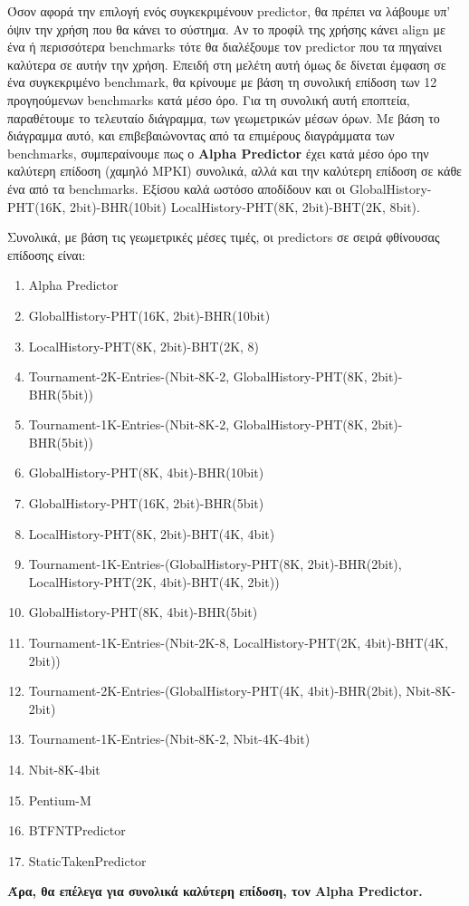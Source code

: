    Όσον αφορά την επιλογή ενός συγκεκριμένουν predictor, θα πρέπει να λάβουμε
   υπ' όψιν την χρήση που θα κάνει το σύστημα. Αν το προφίλ της χρήσης κάνει
   align με ένα ή περισσότερα benchmarks τότε θα διαλέξουμε τον predictor που τα
   πηγαίνει καλύτερα σε αυτήν την χρήση. Επειδή στη μελέτη αυτή όμως δε δίνεται
   έμφαση σε ένα συγκεκριμένο benchmark, θα κρίνουμε με βάση τη συνολική επίδοση
   των 12 προγηούμενων benchmarks κατά μέσο όρο. Για τη συνολική αυτή εποπτεία,
   παραθέτουμε το τελευταίο διάγραμμα, των γεωμετρικών μέσων όρων. Με βάση το
   διάγραμμα αυτό, και επιβεβαιώνοντας από τα επιμέρους διαγράμματα των
   benchmarks, συμπεραίνουμε πως ο \textbf{Alpha Predictor} έχει κατά μέσο όρο
   την καλύτερη επίδοση (χαμηλό MPKI) συνολικά, αλλά και την καλύτερη επίδοση σε
   κάθε ένα από τα benchmarks. Εξίσου καλά ωστόσο αποδίδουν και οι
   GlobalHistory-PHT(16K, 2bit)-BHR(10bit) LocalHistory-PHT(8K, 2bit)-BHT(2K,
   8bit).

   \vspace{1em}
   \noindent Συνολικά, με βάση τις γεωμετρικές μέσες τιμές, οι predictors σε σειρά
   φθίνουσας επίδοσης είναι: {\small 
   \begin{enumerate}
      \item Alpha Predictor
      \item GlobalHistory-PHT(16K, 2bit)-BHR(10bit)
      \item LocalHistory-PHT(8K, 2bit)-BHT(2K, 8)
      \item Tournament-2K-Entries-(Nbit-8K-2, GlobalHistory-PHT(8K, 2bit)-BHR(5bit))
      \item Tournament-1K-Entries-(Nbit-8K-2, GlobalHistory-PHT(8K, 2bit)-BHR(5bit))
      \item GlobalHistory-PHT(8K, 4bit)-BHR(10bit)
      \item GlobalHistory-PHT(16K, 2bit)-BHR(5bit)
      \item LocalHistory-PHT(8K, 2bit)-BHT(4K, 4bit)
      \item Tournament-1K-Entries-(GlobalHistory-PHT(8K, 2bit)-BHR(2bit), LocalHistory-PHT(2K, 4bit)-BHT(4K, 2bit))
      \item GlobalHistory-PHT(8K, 4bit)-BHR(5bit)
      \item Tournament-1K-Entries-(Nbit-2K-8, LocalHistory-PHT(2K, 4bit)-BHT(4K, 2bit))
      \item Tournament-2K-Entries-(GlobalHistory-PHT(4K, 4bit)-BHR(2bit), Nbit-8K-2bit)
      \item Tournament-1K-Entries-(Nbit-8K-2, Nbit-4K-4bit)
      \item Nbit-8K-4bit
      \item Pentium-M
      \item BTFNTPredictor
      \item StaticTakenPredictor
   \end{enumerate}
   }
   \vspace{1em}
   \noindent \textbf{Άρα, θα επέλεγα για συνολικά καλύτερη επίδοση, τoν Alpha Predictor.}